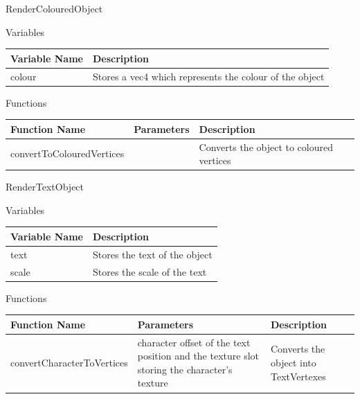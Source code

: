 \documentclass{article}
\begin{document}
                RenderColouredObject
                \begin{center}
                    Variables
                    \begin{tabular}{ | m{} | m{} | }
                        \hline
                        \textbf{Variable Name} & \textbf{Description} \\
                        \hline
                        colour & Stores a vec4 which represents the colour of the object \\
                        \hline
                    \end{tabular}
                    Functions
                    \begin{tabular}{ | m{} | m{}| m{} | }
                        \hline
                        \textbf{Function Name} & \textbf{Parameters} & \textbf{Description} \\
                        \hline
                        convertToColouredVertices & & Converts the object to coloured vertices \\
                        \hline
                    \end{tabular}
                \end{center}
                RenderTextObject
                \begin{center}
                    Variables
                    \begin{tabular}{ | m{} | m{} | }
                        \hline
                        \textbf{Variable Name} & \textbf{Description} \\
                        \hline
                        text & Stores the text of the object \\
                        \hline
                        scale & Stores the scale of the text \\
                        \hline
                    \end{tabular}
                    Functions
                    \begin{tabular}{ | m{} | m{}| m{} | }
                        \hline
                        \textbf{Function Name} & \textbf{Parameters} & \textbf{Description} \\
                        \hline
                        convertCharacterToVertices & character offset of the text position and the texture slot storing the character's texture & Converts the object into TextVertexes \\
                        \hline
                    \end{tabular}
                \end{center}
\end{document}
